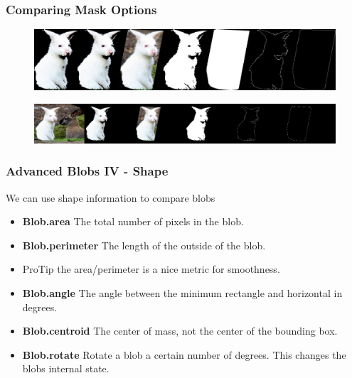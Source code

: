 \documentclass{beamer}
\begin{document}
\begin{frame}
\frametitle{Comparing Mask Options}
 \begin{figure}
     \includegraphics[width=0.9\linewidth]{albinoblob.png}
 \end{figure}
 \begin{figure}
     \includegraphics[width=0.9\linewidth]{albinoimgs.png}
 \end{figure}
\end{frame}
\begin{frame}
  \frametitle{Advanced Blobs IV - Shape}
We can use shape information to compare blobs
\begin{itemize}
\item \textbf{Blob.area} The total number of pixels in the blob.
\item \textbf{Blob.perimeter} The length of the outside of the blob.
\item ProTip the area/perimeter is a nice metric for smoothness.
\item \textbf{Blob.angle} The angle between the minimum rectangle and
  horizontal in degrees. 
\item \textbf{Blob.centroid} The center of mass, not the center of the
  bounding box.
\item \textbf{Blob.rotate} Rotate a blob a certain number of
  degrees. This changes the blobs internal state. 

\end{itemize}
\end{frame}
\end{document}
